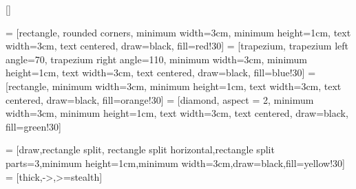 \geometry{a4paper,top=30mm,bottom=30mm,right=35mm,left=25mm}
\setlength{\parindent}{0em}
\setlength{\parskip}{1em}
\renewcommand{\baselinestretch}{1.5}
\renewcommand{\thesection}{\arabic{section}}
\renewcommand{\contentsname}{Indholdsfortegnelse}
\hypersetup{
    colorlinks=true,
    linkcolor=blue,
    filecolor=magenta,     
    urlcolor=cyan,
    citecolor=blue,
}
\renewcommand{\figurename}{Figur}
\renewcommand{\tablename}{Tabel}
\usepackage[format=plain,
            labelfont={bf,it},
            textfont=it]{caption}

           

[]{}
\graphicspath{ {./Figures/} }

\setcounter{tocdepth}{2}   
\setcounter{secnumdepth}{4}

\setcounter{biburllcpenalty}{9000}

 
 = [rectangle, rounded corners, minimum width=3cm, minimum height=1cm, text width=3cm, text centered, draw=black, fill=red!30]
 = [trapezium, trapezium left angle=70, trapezium right angle=110, minimum width=3cm, minimum height=1cm, text width=3cm, text centered, draw=black, fill=blue!30]
 = [rectangle, minimum width=3cm, minimum height=1cm, text width=3cm, text centered, draw=black, fill=orange!30]
 = [diamond, aspect = 2, minimum width=3cm, minimum height=1cm, text width=3cm, text centered, draw=black, fill=green!30]

 = [draw,rectangle split, rectangle split horizontal,rectangle split parts=3,minimum height=1cm,minimum width=3cm,draw=black,fill=yellow!30]
 = [thick,->,>=stealth]

\usepackage{xcolor}




